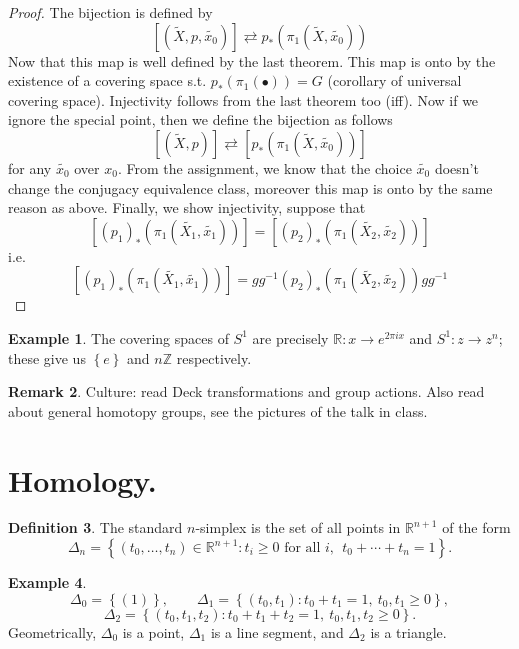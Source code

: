 \documentclass[11pt,a4paper]{article}
\theoremstyle{definition}
\newtheorem{definition}{Definition}[section]
\newtheorem{example}[definition]{Example}
\newtheorem{remark}[definition]{Remark}
\theoremstyle{plain}
\theoremstyle{remark}
\newcommand{\R}{\mathbb{R}}
\newcommand{\Z}{\mathbb{Z}}
\renewcommand{\set}[1]{\left\{ #1 \right\}}
\newcommand{\1}{\mathbbm{1}}
\begin{document}
\begin{proof}
    The bijection is defined by 
    $$[(\tilde{X}, p, \tilde{x_0})] \rightleftarrows p_*(\pi_1(\tilde{X}, \tilde{x_0}))$$
    Now that this map is well defined by the last theorem. This map is onto by the existence of a covering space s.t. 
    $p_*(\pi_1(\bullet)) = G$ (corollary of universal covering space). Injectivity follows from the last theorem too (iff). 
    Now if we ignore the special point, then we define the bijection as follows 
    $$[(\tilde{X}, p)] \rightleftarrows [p_*(\pi_1(\tilde{X}, \tilde{x_0}))]$$
    for any $\tilde{x_0}$ over $x_0$. From the assignment, we know that the choice $\tilde{x_0}$ doesn't change the conjugacy equivalence 
    class, moreover this map is onto by the same reason as above. Finally, we show injectivity, suppose that 
    $$[(p_1)_* \left(\pi_1(\tilde{X_1}, \tilde{x_1})\right)] = [(p_2)_* \left(\pi_1(\tilde{X_2}, \tilde{x_2})\right)]$$
    i.e. 
    $$[(p_1)_* (\pi_1(\tilde{X_1}, \tilde{x_1}) )] = gg^{-1} (p_2)_* (\pi_1(\tilde{X_2}, \tilde{x_2})) gg^{-1}$$
\end{proof}

\begin{example}
    The covering spaces of $S^1$ are precisely $\R \colon x \to e^{2\pi i x}$ and 
    $S^1 \colon z \to z^n$; these give us $\set{e}$ and $n \Z$ respectively. 
\end{example}

\begin{remark}
    Culture: read Deck transformations and group actions. 
    Also read about general homotopy groups, see the pictures of the talk in class. 
\end{remark}

\section{Homology.}

\begin{definition}
    The standard $n$-simplex is the set of all points in $\mathbb{R}^{n+1}$ of the form
    \[
    \Delta_n = \set{(t_0,\dots,t_n) \in \mathbb{R}^{n+1} \colon t_i \ge 0 \text{ for all } i,\ \ t_0+\cdots+t_n = 1}.
    \]
\end{definition}

\begin{example}
    \[
    \Delta_0 = \set{(1)}, \qquad
    \Delta_1 = \set{(t_0,t_1) \colon t_0+t_1=1,\ t_0,t_1\ge 0},
    \]
    \[
    \Delta_2 = \set{(t_0,t_1,t_2) \colon t_0+t_1+t_2=1,\ t_0,t_1,t_2\ge 0}.
    \]
    Geometrically, $\Delta_0$ is a point, $\Delta_1$ is a line segment, and $\Delta_2$ is a triangle.
\end{example}
\end{document}

